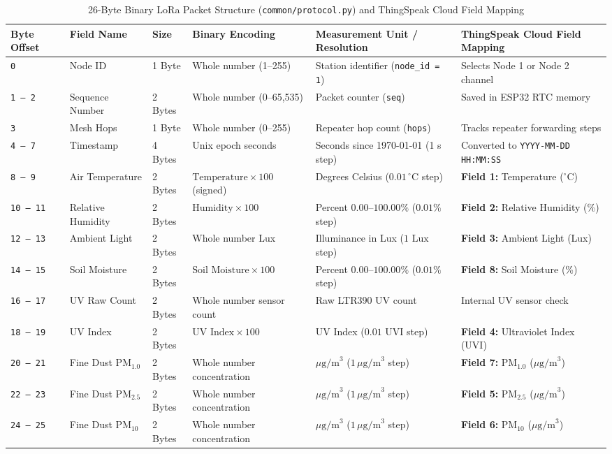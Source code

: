 \documentclass[conference,onecolumn]{IEEEtran}
\begin{document}
\begin{table}[!htbp]
\centering
\caption{26-Byte Binary LoRa Packet Structure (\texttt{common/protocol.py}) and ThingSpeak Cloud Field Mapping}
\label{tab:protocol}
\scriptsize
\setlength{\tabcolsep}{4pt}
\renewcommand{\arraystretch}{0.91}
\begin{tabularx}{\textwidth}{C{1.6cm} L{2.8cm} C{1.1cm} L{3.3cm} L{3.5cm} Y}
\toprule
\textbf{Byte Offset} & \textbf{Field Name} & \textbf{Size} & \textbf{Binary Encoding} & \textbf{Measurement Unit / Resolution} & \textbf{ThingSpeak Cloud Field Mapping} \\
\midrule
\texttt{0} & Node ID & 1 Byte & Whole number (1--255) & Station identifier (\texttt{node\_id = 1}) & Selects Node 1 or Node 2 channel \\
\texttt{1 -- 2} & Sequence Number & 2 Bytes & Whole number (0--65,535) & Packet counter (\texttt{seq}) & Saved in ESP32 RTC memory \\
\texttt{3} & Mesh Hops & 1 Byte & Whole number (0--255) & Repeater hop count (\texttt{hops}) & Tracks repeater forwarding steps \\
\texttt{4 -- 7} & Timestamp & 4 Bytes & Unix epoch seconds & Seconds since 1970-01-01 (1 s step) & Converted to \texttt{YYYY-MM-DD HH:MM:SS} \\
\texttt{8 -- 9} & Air Temperature & 2 Bytes & $\text{Temperature} \times 100$ (signed) & Degrees Celsius ($0.01\,^\circ\text{C}$ step) & \textbf{Field 1:} Temperature ($^\circ$C) \\
\texttt{10 -- 11} & Relative Humidity & 2 Bytes & $\text{Humidity} \times 100$ & Percent $0.00\text{--}100.00\%$ ($0.01\%$ step) & \textbf{Field 2:} Relative Humidity (\%) \\
\texttt{12 -- 13} & Ambient Light & 2 Bytes & Whole number Lux & Illuminance in Lux ($1\text{ Lux}$ step) & \textbf{Field 3:} Ambient Light (Lux) \\
\texttt{14 -- 15} & Soil Moisture & 2 Bytes & $\text{Soil Moisture} \times 100$ & Percent $0.00\text{--}100.00\%$ ($0.01\%$ step) & \textbf{Field 8:} Soil Moisture (\%) \\
\texttt{16 -- 17} & UV Raw Count & 2 Bytes & Whole number sensor count & Raw LTR390 UV count & Internal UV sensor check \\
\texttt{18 -- 19} & UV Index & 2 Bytes & $\text{UV Index} \times 100$ & UV Index ($0.01\text{ UVI}$ step) & \textbf{Field 4:} Ultraviolet Index (UVI) \\
\texttt{20 -- 21} & Fine Dust PM$_{1.0}$ & 2 Bytes & Whole number concentration & $\mu\text{g/m}^3$ ($1\,\mu\text{g/m}^3$ step) & \textbf{Field 7:} PM$_{1.0}$ ($\mu\text{g/m}^3$) \\
\texttt{22 -- 23} & Fine Dust PM$_{2.5}$ & 2 Bytes & Whole number concentration & $\mu\text{g/m}^3$ ($1\,\mu\text{g/m}^3$ step) & \textbf{Field 5:} PM$_{2.5}$ ($\mu\text{g/m}^3$) \\
\texttt{24 -- 25} & Fine Dust PM$_{10}$ & 2 Bytes & Whole number concentration & $\mu\text{g/m}^3$ ($1\,\mu\text{g/m}^3$ step) & \textbf{Field 6:} PM$_{10}$ ($\mu\text{g/m}^3$) \\
\bottomrule
\end{tabularx}
\end{table}
\end{document}
